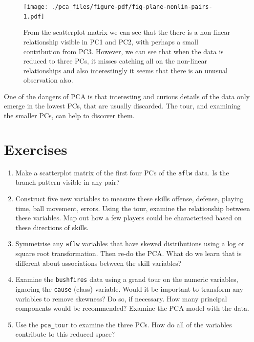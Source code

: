\documentclass[
  letterpaper,
]{book}
\newenvironment{Shaded}{\begin{snugshade}}{\end{snugshade}}
\newcommand{\FunctionTok}[1]{\textcolor[rgb]{0.28,0.35,0.67}{#1}}
\newcommand{\NormalTok}[1]{\textcolor[rgb]{0.00,0.23,0.31}{#1}}
\newcommand{\SpecialCharTok}[1]{\textcolor[rgb]{0.37,0.37,0.37}{#1}}
\providecommand{\tightlist}{%
  \setlength{\itemsep}{0pt}\setlength{\parskip}{0pt}}\usepackage{longtable,booktabs,array}
\begin{document}
\begin{Shaded}
\end{Shaded}

\begin{figure}[H]

{\centering \texttt{[image: ./pca\_files/figure-pdf/fig-plane-nonlin-pairs-1.pdf]}

}

\caption{\label{fig-plane-nonlin-pairs}From the scatterplot matrix we
can see that the there is a non-linear relationship visible in PC1 and
PC2, with perhaps a small contribution from PC3. However, we can see
that when the data is reduced to three PCs, it misses catching all on
the non-linear relationships and also interestingly it seems that there
is an unusual observation also.}

\end{figure}

One of the dangers of PCA is that interesting and curious details of the
data only emerge in the lowest PCs, that are usually discarded. The
tour, and examining the smaller PCs, can help to discover them.

\hypertarget{exercises-3}{%
\section*{Exercises}\label{exercises-3}}


\begin{enumerate}
\def\labelenumi{\arabic{enumi}.}
\tightlist
\item
  Make a scatterplot matrix of the first four PCs of the \texttt{aflw}
  data. Is the branch pattern visible in any pair?
\item
  Construct five new variables to measure these skills offense, defense,
  playing time, ball movement, errors. Using the tour, examine the
  relationship between these variables. Map out how a few players could
  be characterised based on these directions of skills.
\item
  Symmetrise any \texttt{aflw} variables that have skewed distributions
  using a log or square root transformation. Then re-do the PCA. What do
  we learn that is different about associations between the skill
  variables?
\item
  Examine the \texttt{bushfires} data using a grand tour on the numeric
  variables, ignoring the \texttt{cause} (class) variable. Would it be
  important to transform any variables to remove skewness? Do so, if
  necessary. How many principal components would be recommended? Examine
  the PCA model with the data.
\item
  Use the \texttt{pca\_tour} to examine the three PCs. How do all of the
  variables contribute to this reduced space?
\end{enumerate}
\end{document}
